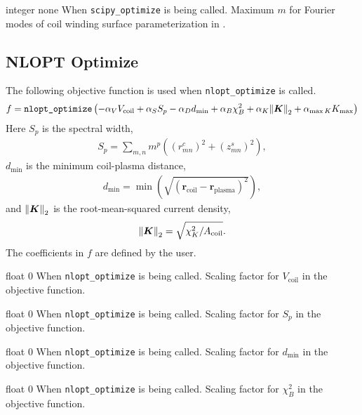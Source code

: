 \myhrule

{integer}
{none}
{When \texttt{scipy\_optimize} is being called.}
{Maximum $m$ for Fourier modes of coil winding surface parameterization in .}

\myhrule

\subsection{NLOPT Optimize}
The following objective function is used when \texttt{nlopt\_optimize} is called.
\begin{gather}
f = \texttt{nlopt\_optimize} \left( -\alpha_V V_{\text{coil}} + \alpha_S S_p - \alpha_D d_{\text{min}} + \alpha_B \chi^2_B + \alpha_K \norm{\bm{K}}_2 + \alpha_{\max K} K_{\max} \right)
\end{gather}
Here $S_p$ is the spectral width,
\begin{gather}
S_p = \sum_{m,n} m^p \left( \left(r_{mn}^c\right)^2 + \left(z_{mn}^s\right)^2 \right),
\label{spectral_width}
\end{gather}
$d_{\text{min}}$ is the minimum coil-plasma distance,
\begin{gather}
d_{\text{min}} = \min \left( \sqrt{ \left(\bm{r}_{\text{coil}} - \bm{r}_{\text{plasma}} \right)^2 } \right),
\end{gather}
and $\norm{\bm{K}}_2$ is the root-mean-squared current density,
\begin{gather}
\norm{\bm{K}}_2 = \sqrt{\chi^2_K/A_{\text{coil}}}.
\end{gather}
The coefficients in $f$ are defined by the user. 

\myhrule

{float}
{0}
{When \texttt{nlopt\_optimize} is being called.}
{Scaling factor for $V_{\text{coil}}$ in the objective function.}

\myhrule

{float}
{0}
{When \texttt{nlopt\_optimize} is being called.}
{Scaling factor for $S_p$ in the objective function.}

\myhrule

{float}
{0}
{When \texttt{nlopt\_optimize} is being called.}
{Scaling factor for $d_{\text{min}}$ in the objective function.}

\myhrule

{float}
{0}
{When \texttt{nlopt\_optimize} is being called.}
{Scaling factor for $\chi^2_B$ in the objective function.}

